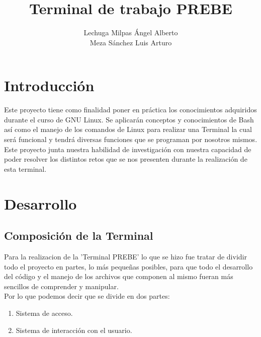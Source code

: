 \documentclass[titlepage]{article}
\title{Terminal de trabajo PREBE}
\author{Lechuga Milpas Ángel Alberto \\ Meza Sánchez Luis Arturo }
\begin{document}
\maketitle

\tableofcontents
\newpage

\section{Introducción}
Este proyecto tiene como finalidad poner en práctica los conocimientos adquiridos durante el curso de GNU Linux. Se aplicarán conceptos y conocimientos de Bash así como el manejo de los comandos de Linux para realizar una Terminal la cual será funcional y tendrá diversas funciones que se programan por nosotros mismos. \\
Este proyecto junta nuestra habilidad de investigación con nuestra capacidad de poder resolver los distintos retos que se nos presenten durante la realización de esta terminal.
\newpage

\section{Desarrollo}

\subsection{Composición de la Terminal}
Para la realizacion de la 'Terminal PREBE' lo que se hizo fue tratar de dividir todo el proyecto en partes, lo más pequeñas posibles, para que todo el desarrollo del código y el manejo de los archivos que componen al mismo fueran más sencillos de comprender y manipular.\\
Por lo que podemos decir que se divide en dos partes:\\
\begin{enumerate}
    \item Sistema de acceso.
    \item Sistema de interacción con el usuario.
\end{enumerate}
\end{document}
